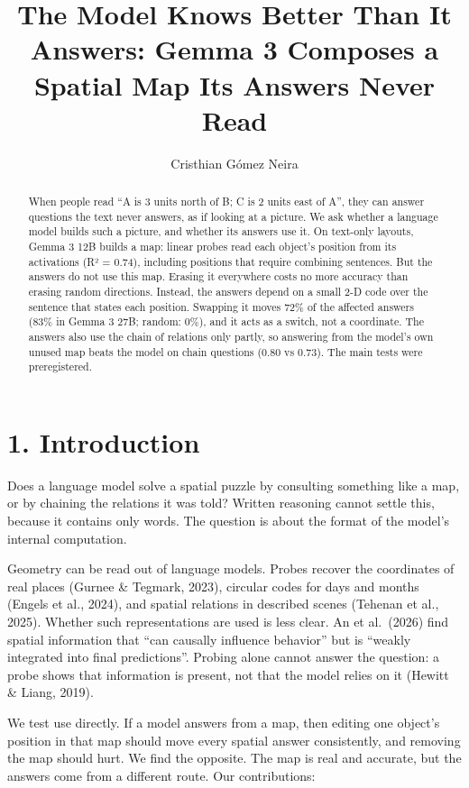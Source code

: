 \documentclass[
  11pt,
]{article}
\title{The Model Knows Better Than It Answers: Gemma 3 Composes a
Spatial Map Its Answers Never Read}
\author{Cristhian Gómez Neira}
\date{}
\begin{document}
\maketitle
\begin{abstract}
When people read ``A is 3 units north of B; C is 2 units east of A'',
they can answer questions the text never answers, as if looking at a
picture. We ask whether a language model builds such a picture, and
whether its answers use it. On text-only layouts, Gemma 3 12B builds a
map: linear probes read each object's position from its activations (R²
= 0.74), including positions that require combining sentences. But the
answers do not use this map. Erasing it everywhere costs no more
accuracy than erasing random directions. Instead, the answers depend on
a small 2-D code over the sentence that states each position. Swapping
it moves 72\% of the affected answers (83\% in Gemma 3 27B; random:
0\%), and it acts as a switch, not a coordinate. The answers also use
the chain of relations only partly, so answering from the model's own
unused map beats the model on chain questions (0.80 vs 0.73). The main
tests were preregistered.
\end{abstract}

\section{1. Introduction}\label{introduction}

Does a language model solve a spatial puzzle by consulting something
like a map, or by chaining the relations it was told? Written reasoning
cannot settle this, because it contains only words. The question is
about the format of the model's internal computation.

Geometry can be read out of language models. Probes recover the
coordinates of real places (Gurnee \& Tegmark, 2023), circular codes for
days and months (Engels et al., 2024), and spatial relations in
described scenes (Tehenan et al., 2025). Whether such representations
are used is less clear. An et al.~(2026) find spatial information that
``can causally influence behavior'' but is ``weakly integrated into
final predictions''. Probing alone cannot answer the question: a probe
shows that information is present, not that the model relies on it
(Hewitt \& Liang, 2019).

We test use directly. If a model answers from a map, then editing one
object's position in that map should move every spatial answer
consistently, and removing the map should hurt. We find the opposite.
The map is real and accurate, but the answers come from a different
route. Our contributions:
\end{document}
